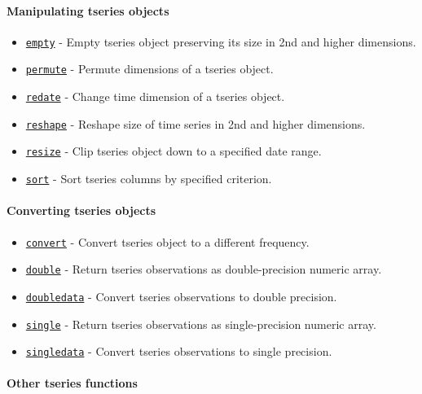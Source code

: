 \paragraph{Manipulating tseries
objects}\label{manipulating-tseries-objects}

\begin{itemize}
\itemsep1pt\parskip0pt
\item
  \href{tseries/empty}{\texttt{empty}} - Empty tseries object preserving
  its size in 2nd and higher dimensions.
\item
  \href{tseries/permute}{\texttt{permute}} - Permute dimensions of a
  tseries object.
\item
  \href{tseries/redate}{\texttt{redate}} - Change time dimension of a
  tseries object.
\item
  \href{tseries/reshape}{\texttt{reshape}} - Reshape size of time series
  in 2nd and higher dimensions.
\item
  \href{tseries/resize}{\texttt{resize}} - Clip tseries object down to a
  specified date range.
\item
  \href{tseries/sort}{\texttt{sort}} - Sort tseries columns by specified
  criterion.
\end{itemize}

\paragraph{Converting tseries objects}\label{converting-tseries-objects}

\begin{itemize}
\itemsep1pt\parskip0pt
\item
  \href{tseries/convert}{\texttt{convert}} - Convert tseries object to a
  different frequency.
\item
  \href{tseries/double}{\texttt{double}} - Return tseries observations
  as double-precision numeric array.
\item
  \href{tseries/doubledata}{\texttt{doubledata}} - Convert tseries
  observations to double precision.
\item
  \href{tseries/single}{\texttt{single}} - Return tseries observations
  as single-precision numeric array.
\item
  \href{tseries/singledata}{\texttt{singledata}} - Convert tseries
  observations to single precision.
\end{itemize}

\paragraph{Other tseries functions}\label{other-tseries-functions}

